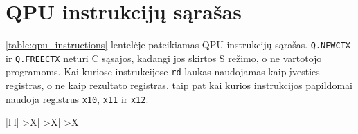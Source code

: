 \section{QPU instrukcijų sąrašas}
\label{chap:priedas-qpu-instr}

\noindent
\ref{table:qpu_instructions} lentelėje pateikiamas QPU instrukcijų sąrašas. \texttt{Q.NEWCTX} ir \texttt{Q.FREECTX} neturi C sąsajos, kadangi jos skirtos S režimo, o ne vartotojo programoms. Kai kuriose instrukcijose \texttt{rd} laukas naudojamas kaip įvesties registras, o ne kaip rezultato registras. taip pat kai kurios instrukcijos papildomai naudoja registrus \texttt{x10}, \texttt{x11} ir \texttt{x12}.

{\footnotesize
\begin{xltabular}{\textwidth}{|l|l|
  >{\hsize}X|
  >{\hsize}X|
  >{\hsize}X|}


\end{xltabular}}
